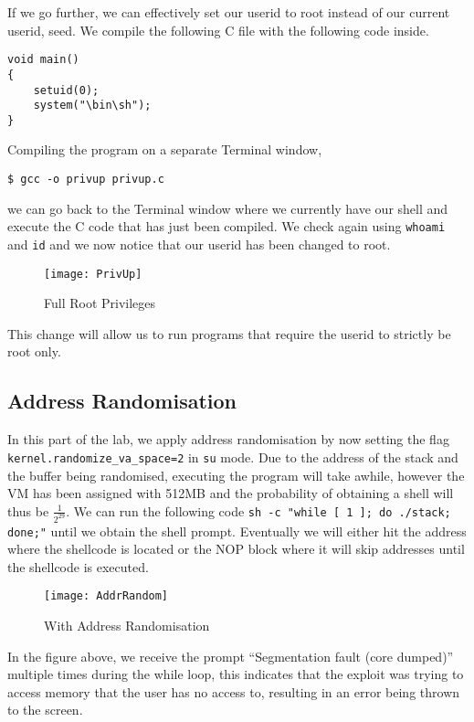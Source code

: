 \documentclass[a4paper,12pt]{article}
\begin{document}
\noindent If we go further, we can effectively set our userid to root instead of our current userid, seed. We compile the following C file with the following code inside.\begin{verbatim}
void main()
{
    setuid(0);
    system("\bin\sh");
}
\end{verbatim}
Compiling the program on a separate Terminal window,
\begin{verbatim}
$ gcc -o privup privup.c
\end{verbatim}
we can go back to the Terminal window where we currently have our shell and execute the C code that has just been compiled. We check again using \texttt{whoami} and \texttt{id} and we now notice that our userid has been changed to root.
\begin{figure}[H]
	\centering
	\texttt{[image: PrivUp]}
	\caption{Full Root Privileges}
	\label{fig:privup}
\end{figure}
\noindent This change will allow us to run programs that require the userid to strictly be root only.
\subsection{Address Randomisation}
In this part of the lab, we apply address randomisation by now setting the flag \texttt{kernel.randomize\_va\_space=2} in \texttt{su} mode. Due to the address of the stack and the buffer being randomised, executing the program will take awhile, however the VM has been assigned with 512MB and the probability of obtaining a shell will thus be $\frac{1}{2^{29}}$. We can run the following code \texttt{sh -c "while [ 1 ]; do ./stack; done;"} until we obtain the shell prompt. Eventually we will either hit the address where the shellcode is located or the NOP block where it will skip addresses until the shellcode is executed.
\begin{figure}[H]
	\centering
	\texttt{[image: AddrRandom]}
	\caption{With Address Randomisation}
	\label{fig:addrrandom}
\end{figure}
\noindent In the figure above, we receive the prompt ``Segmentation fault (core dumped)'' multiple times during the while loop, this indicates that the exploit was trying to access memory that the user has no access to, resulting in an error being thrown to the screen.
\end{document}
